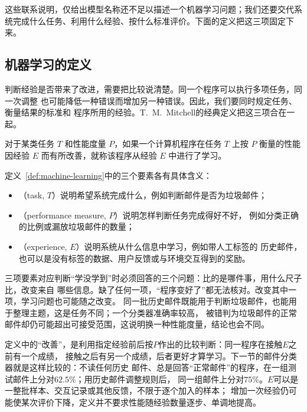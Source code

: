 这些联系说明，仅给出模型名称还不足以描述一个机器学习问题；我们还要交代系统完成什么任务、利用什么经验、按什么标准评价。下面的定义把这三项固定下来。

\subsection{机器学习的定义}

判断经验是否带来了改进，需要把比较说清楚。同一个程序可以执行多项任务，同一次调整
也可能降低一种错误而增加另一种错误。因此，我们要同时规定任务、衡量结果的标准和
程序所用的经验。T.~M.~Mitchell的经典定义把这三项合在一起。

\begin{definition}[机器学习]
\label{def:machine-learning}
对于某类任务 $T$ 和性能度量 $P$，如果一个计算机程序在任务 $T$ 上按 $P$ 衡量的性能
因经验 $E$ 而有所改善，就称该程序从经验 $E$ 中进行了学习。
\end{definition}

定义~\ref{def:machine-learning}中的三个要素各有具体含义：

\begin{itemize}
  \item {}（task, $T$）说明希望系统完成什么，例如判断邮件是否为垃圾邮件；
  \item {}（performance measure, $P$）说明怎样判断任务完成得好不好，
    例如分类正确的比例或漏放垃圾邮件的数量；
  \item {}（experience, $E$）说明系统从什么信息中学习，例如带人工标签的
    历史邮件，也可以是没有标签的数据、用户反馈或与环境交互得到的奖励。
\end{itemize}

三项要素对应判断“学没学到”时必须回答的三个问题：比的是哪件事，用什么尺子比，改变来自
哪些信息。缺了任何一项，“程序变好了”都无法核对。改变其中一项，学习问题也可能随之改变。
同一批历史邮件既能用于判断垃圾邮件，也能用于整理主题，这是任务不同；一个分类器准确率较高，
被错判为垃圾邮件的正常邮件却仍可能超出可接受范围，这说明换一种性能度量，结论也会不同。

定义中的“改善”，是利用指定经验前后按$P$作出的比较判断：同一程序在接触$E$之前有一个成绩，
接触之后有另一个成绩，后者更好才算学习。下一节的邮件分类器就是这样比较的：不读任何历史
邮件、总是回答“正常邮件”的程序，在一组测试邮件上分对$62.5\%$；用历史邮件调整规则后，
同一组邮件上分对$75\%$。$E$可以是一整批样本、交互记录或其他反馈，不限于逐个加入的样本；
增加一次经验仍可能使某次评价下降，定义并不要求性能随经验数量逐步、单调地提高。

